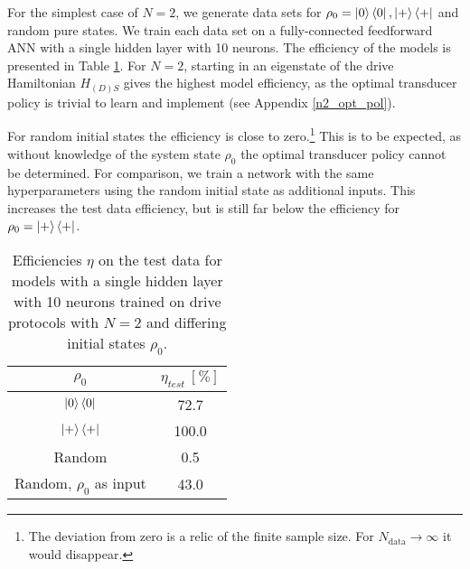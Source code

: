 For the simplest case of $N = 2$, we generate data sets for $\rho_0 = \ket{0} \bra{0}, \ket{+} \bra{+}$ and random pure states.
We train each data set on a fully-connected feedforward ANN with a single hidden layer with 10 neurons.
The efficiency of the models is presented in Table \ref{n2efftable}.
For $N = 2$, starting in an eigenstate of the drive Hamiltonian $H_{(D)S}$ gives the highest model efficiency, as the optimal transducer policy is trivial to learn and implement (see Appendix \ref{n2_opt_pol}).

For random initial states the efficiency is close to zero.\footnote{The deviation from zero is a relic of the finite sample size. For $N_{\mathrm{data}} \to \infty$ it would disappear.}
This is to be expected, as without knowledge of the system state $\rho_0$ the optimal transducer policy cannot be determined.
For comparison, we train a network with the same hyperparameters using the random initial state as additional inputs.
This increases the test data efficiency, but is still far below the efficiency for $\rho_0 = \ket{+} \bra{+}$.


\begin{table}[h]
	\centering
	\begin{tabular}{ c | c }
		$\rho_0$ & $\eta_{test} \ [\%]$ \\
		\hline
		$\ket{0} \bra{0}$ & 72.7 \\
		$\ket{+} \bra{+}$ & 100.0 \\
		Random & 0.5 \\
		Random, $\rho_0$ as input & 43.0 \\
	\end{tabular}
	\caption{Efficiencies $\eta$ on the test data for models with a single hidden layer with 10 neurons trained on drive protocols with $N = 2$ and differing initial states $\rho_0$.}
	\label{n2efftable}
\end{table}